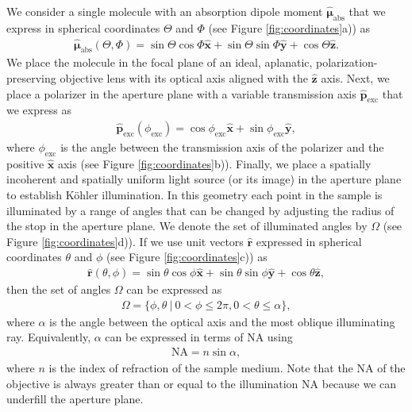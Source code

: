 \documentclass[10pt]{article}
\providecommand{\mb}[1]{\mathbf{#1}}
\providecommand{\mh}[1]{\mathbf{\hat{#1}}}
\providecommand{\bs}[1]{\boldsymbol{#1}}
\begin{document}
We consider a single molecule with an absorption dipole moment
$\hat{\bs{\mu}}_{\text{abs}}$ that we express in spherical coordinates $\Theta$
and $\Phi$ (see Figure \ref{fig:coordinates}a)) as
\begin{align}
  \hat{\bs{\mu}}_{\text{abs}}(\Theta, \Phi) = \sin\Theta\cos\Phi\hat{\mb{x}} + \sin\Theta\sin\Phi\hat{\mb{y}} + \cos\Theta\hat{\mb{z}} \label{eq:mu}.
\end{align}
We place the molecule in the focal plane of an ideal, aplanatic,
polarization-preserving objective lens with its optical axis aligned with the
$\mh{z}$ axis. Next, we place a polarizer in the aperture plane with a variable
transmission axis $\hat{\mb{p}}_{\text{exc}}$ that we express as
\begin{align}
 \hat{\mb{p}}_{\text{exc}}(\phi_{\text{exc}}) = \cos\phi_{\text{exc}}\hat{\mb{x}} +
\sin\phi_{\text{exc}}\hat{\mb{y}},\label{eq:excfield}
\end{align}
where $\phi_{\text{exc}}$ is the angle between the transmission axis of the
polarizer and the positive $\mh{x}$ axis (see Figure
\ref{fig:coordinates}b)). Finally, we place a spatially incoherent and spatially
uniform light source (or its image) in the aperture plane to establish K\"ohler
illumination. In this geometry each point in the sample is illuminated by a
range of angles that can be changed by adjusting the radius of the stop in the
aperture plane. We denote the set of illuminated angles by $\Omega$ (see Figure
\ref{fig:coordinates}d)). If we use unit vectors $\hat{\mb{r}}$ expressed in
spherical coordinates $\theta$ and $\phi$ (see Figure \ref{fig:coordinates}c))
as
  \begin{align}
   \hat{\mb{r}}(\theta, \phi) = \sin\theta\cos\phi\hat{\mb{x}} + \sin\theta\sin\phi\hat{\mb{y}} + \cos\theta\hat{\mb{z}}, 
  \end{align}
  then the set of angles $\Omega$ can be expressed as
  \begin{align}
  \Omega = \{\phi, \theta\ |\ 0 < \phi \leq 2\pi, 0 < \theta \leq \alpha\},
  \end{align}
  where $\alpha$ is the angle between the optical axis and the most oblique
  illuminating ray. Equivalently, $\alpha$ can be expressed in terms of NA using
  \begin{align}
    \text{NA} = n\sin\alpha, 
  \end{align}
  where $n$ is the index of refraction of the sample medium. Note that the NA of
  the objective is always greater than or equal to the illumination NA because
  we can underfill the aperture plane.
  
\end{document}
